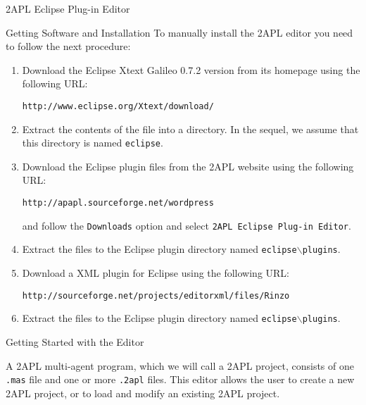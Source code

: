 \begin{section}{2APL Eclipse Plug-in Editor}
\begin{section}{Getting Software and Installation}
To manually install the 2APL editor you need to follow the next
procedure:

\begin{enumerate}
    \item Download the Eclipse Xtext Galileo 0.7.2 version from its homepage using the following URL:
    \begin{center}
        {\tt http://www.eclipse.org/Xtext/download/}
    \end{center}

    \item Extract the contents of the file into a directory. In the sequel, we assume that this directory is named {\tt eclipse}.

    \item Download the Eclipse plug\-in files from the 2APL website using the following URL:
    \begin{center}
    {\tt http://apapl.sourceforge.net/wordpress}
    \end{center}
    and follow the {\tt Downloads} option and select {\tt 2APL Eclipse Plug-in Editor}.

    \item Extract the files to the Eclipse plug\-in directory named {\tt eclipse$\backslash$plugins}.

    \item Download a XML plug\-in for Eclipse using the following URL:
    \begin{center}
    {\tt http://sourceforge.net/projects/editorxml/files/Rinzo}
    \end{center}

    \item Extract the files to the Eclipse plug\-in directory named
    {\tt eclipse$\backslash$plugins}.
\end{enumerate}
\end{section}


\begin{section}{Getting Started with the Editor}

A 2APL multi-agent program, which we will call a 2APL project,
consists of one \texttt{.mas} file and one or more \texttt{.2apl}
files. This editor allows the user to create a new 2APL project, or
to load and modify an existing 2APL project.


\end{section}
\end{section}
